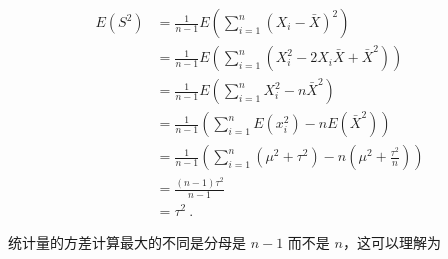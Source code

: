 \begin{equation}
\begin{aligned}
E(S^2) &= \frac {1}{n-1}E(\sum_{i=1}^n(X_i-\bar X)^2) \\
&= \frac {1}{n-1}E(\sum_{i=1}^n(X_i^2-2X_i\bar X+\bar X^2))\\
&= \frac {1}{n-1}E(\sum_{i=1}^nX_i^2-n\bar X^2)\\
&= \frac {1}{n-1} (\sum_{i=1}^nE(x_i^2)-nE(\bar X^2))\\
&= \frac {1}{n-1}(\sum_{i=1}^n(\mu^2+\tau^2)-n(\mu^2+\frac{\tau^2}{n}))\\
&= \frac {(n-1)\tau^2}{n-1}\\
&= \tau^2~.
\end{aligned}
\end{equation}

统计量的方差计算最大的不同是分母是 $n-1$ 而不是 $n$，这可以理解为

